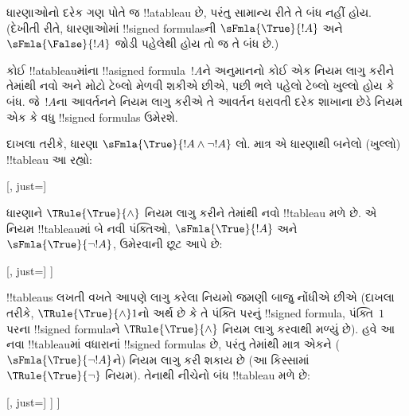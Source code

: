 \documentclass[../../../include/open-logic-section]{subfiles}
\begin{document}
\begin{ex}
  ધારણાઓનો દરેક ગણ પોતે જ !!a{tableau} છે, પરંતુ સામાન્ય રીતે તે બંધ
  નહીં હોય. (દેખીતી રીતે, ધારણાઓમાં !!{signed formula}sની
  $\sFmla{\True}{!A}$ અને~$\sFmla{\False}{!A}$ જોડી પહેલેથી હોય તો જ
  તે બંધ છે.)

  કોઈ !!a{tableau}માંના !!a{signed formula}~$!A$ને અનુમાનનો કોઈ એક
  નિયમ લાગુ કરીને તેમાંથી નવો અને મોટો ટેબ્લો મેળવી શકીએ છીએ, પછી ભલે
  પહેલો ટેબ્લો ખુલ્લો હોય કે બંધ. જે~$!A$ના આવર્તનને નિયમ લાગુ કરીએ તે
  આવર્તન ધરાવતી દરેક શાખાના છેડે નિયમ એક કે વધુ !!{signed formula}s
  ઉમેરશે.

  દાખલા તરીકે, ધારણા $\sFmla{\True}{!A \land \lnot !A}$ લો. માત્ર એ
  ધારણાથી બનેલો (ખુલ્લો) !!{tableau} આ રહ્યો:
  \begin{center}
    \begin{tableau}{}
      [, just=\TAss]
    \end{tableau}{}
  \end{center}
  ધારણાને $\TRule{\True}{\land}$ નિયમ લાગુ કરીને તેમાંથી નવો
  !!{tableau} મળે છે. એ નિયમ !!{tableau}માં બે નવી પંક્તિઓ,
  $\sFmla{\True}{!A}$ અને $\sFmla{\True}{\lnot !A}$, ઉમેરવાની છૂટ આપે છે:
  \begin{center}
    \begin{tableau}{}
      [, just=\TAss
        [\sFmla{\True}{\formula{A}}, just={\TRule{\True}{\land}[1]},
          [\sFmla{\True}{\lnot \formula{A}}, just={\TRule{\True}{\land}[1]}
          ]
        ]
      ]
    \end{tableau}{}
  \end{center}
  !!{tableau}s લખતી વખતે આપણે લાગુ કરેલા નિયમો જમણી બાજુ નોંધીએ છીએ
  (દાખલા તરીકે, $\TRule{\True}{\land} 1$નો અર્થ છે કે તે પંક્તિ પરનું
  !!{signed formula}, પંક્તિ~$1$ પરના !!{signed formula}ને
  $\TRule{\True}{\land}$ નિયમ લાગુ કરવાથી મળ્યું છે). હવે આ નવા
  !!{tableau}માં વધારાનાં !!{signed formula}s છે, પરંતુ તેમાંથી માત્ર
  એકને ($\sFmla{\True}{\lnot !A}$ને) નિયમ લાગુ કરી શકાય છે (આ કિસ્સામાં
  $\TRule{\True}{\lnot}$ નિયમ). તેનાથી નીચેનો બંધ !!{tableau} મળે છે:
  \begin{center}
    \begin{tableau}{}
      [, just=\TAss
        [\sFmla{\True}{\formula{A}}, just={\TRule{\True}{\land}[1]}
          [\sFmla{\True}{\lnot \formula{A}}, just={\TRule{\True}{\land}[1]}
            [\sFmla{\False}{\formula{A}}, just={\TRule{\True}{\lnot}[3]}, close]
          ]
        ]
      ]
    \end{tableau}{}
  \end{center}
\end{ex}
\end{document}
